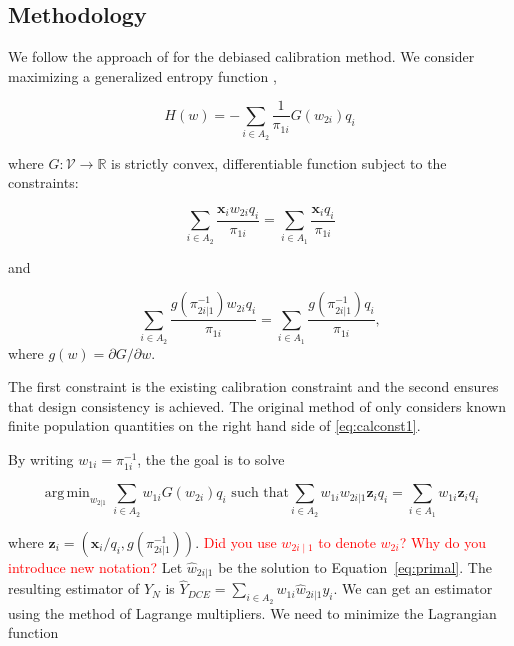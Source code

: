 \documentclass[12pt]{article}
\DeclareMathOperator*{\argmin}{arg\,min}
\newcommand{\R}{\mathbb{R}}
\renewcommand{\bf}[1]{\mathbf{#1}}
\begin{document}
\subsection{Methodology}

We follow the approach of \cite{kwon2024debiased} for the debiased calibration
method. We consider maximizing a generalized entropy function
\cite{gneiting2007strictly},

\begin{equation}\label{eq:primalloss}
  H(w) = - \sum_{i \in A_2} \frac{1}{\pi_{1i}} G(w_{2i}) q_i
\end{equation}

where $G: \mathcal{V} \to \R$ is strictly convex, differentiable function
subject to the constraints:

\begin{equation}\label{eq:calconst1}
  \sum_{i \in A_2} \frac{\bf x_i w_{2i}q_i}{\pi_{1i}} = 
\sum_{i \in A_1} \frac{\bf x_iq_i}{\pi_{1i}}
\end{equation}

and 

\begin{equation}\label{eq:calconst2}
  \sum_{i \in A_2} \frac{g(\pi_{2i|1}^{-1})w_{2i}q_i}{\pi_{1i}} = 
  \sum_{i \in A_1} \frac{g(\pi_{2i|1}^{-1})q_i}{\pi_{1i}}, 
\end{equation}
where $g(w) = \partial G / \partial w$. 

The first constraint is the existing calibration constraint and the second
ensures that design consistency is achieved. 
The original method of \cite{kwon2024debiased} only considers known finite
population quantities on the right hand side of \eqref{eq:calconst1}.

By writing $w_{1i} = \pi_{1i}^{-1}$, the the goal is to solve

\begin{equation}\label{eq:primal}
  \argmin_{w_{2|1}} \sum_{i \in A_2} w_{1i} G(w_{2i}) q_i 
  \text{ such that}
  \sum_{i \in A_2} w_{1i} w_{2i|1} \bf z_i q_i = \sum_{i \in A_1} w_{1i} \bf z_i q_i
\end{equation}

where  $\bf z_i = (\bf x_i / q_i, g(\pi_{2i|1}^{-1}))$. 
\textcolor{red}{Did you use $w_{2i \mid 1}$ to denote $w_{2i}$? Why do you introduce new notation?  } 
Let $\hat w_{2i|1}$ be the solution to Equation~\eqref{eq:primal}. The resulting 
estimator of $Y_N$ is $\hat Y_{DCE} = \sum_{i \in A_2} w_{1i} \hat w_{2i|1} y_i$.
We can get an estimator using the method of Lagrange multipliers. We need to
minimize the Lagrangian function
\end{document}
